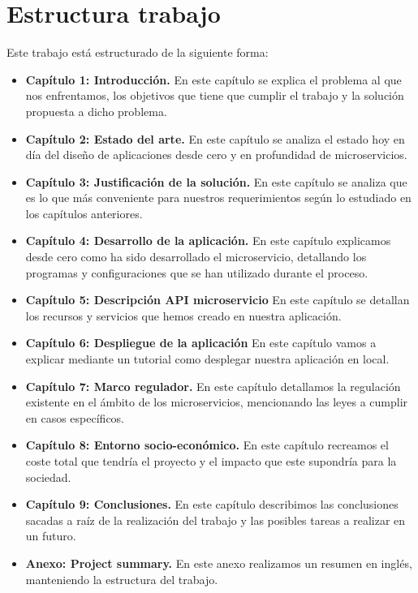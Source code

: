 \documentclass[12pt]{report} %
\begin{document}
	\section{Estructura trabajo}
	Este trabajo está estructurado de la siguiente forma:
	
	\begin{itemize}
		\item \textbf{Capítulo 1: Introducción.} En este capítulo se explica el problema al que nos enfrentamos, los objetivos que tiene que cumplir el trabajo y la solución propuesta a dicho problema.
		\item  \textbf{Capítulo 2: Estado del arte.}  En este capítulo se analiza el estado hoy en día  del diseño de aplicaciones desde cero y en profundidad de microservicios.
		\item  \textbf{Capítulo 3: Justificación de la solución.} En este capítulo se analiza que es lo que más conveniente para nuestros requerimientos según lo estudiado en los capítulos anteriores.
		\item  \textbf{Capítulo 4: Desarrollo de la aplicación.} En este capítulo explicamos desde cero como ha sido desarrollado el microservicio, detallando los programas y configuraciones que se han utilizado durante el proceso. 
		\item  \textbf{Capítulo 5: Descripción API microservicio} En este capítulo se detallan los recursos y servicios que hemos creado en nuestra aplicación.
		\item  \textbf{Capítulo 6: Despliegue de la aplicación} En este capítulo vamos a explicar mediante un tutorial como desplegar nuestra aplicación en local.
		\item  \textbf{Capítulo 7: Marco regulador.} En este capítulo detallamos la regulación existente en el ámbito de los microservicios, mencionando las leyes a cumplir en casos específicos.
		\item  \textbf{Capítulo 8: Entorno socio-económico.} En este capítulo recreamos el coste total que tendría el proyecto y el impacto que este supondría para la sociedad.
		\item  \textbf{Capítulo 9: Conclusiones.} En este capítulo describimos las conclusiones sacadas a raíz de la realización del trabajo y las posibles tareas a realizar en un futuro.
		\item  \textbf{Anexo: Project summary.} En este anexo realizamos un resumen en inglés, manteniendo la estructura del trabajo.

	\end{itemize}
\end{document}
